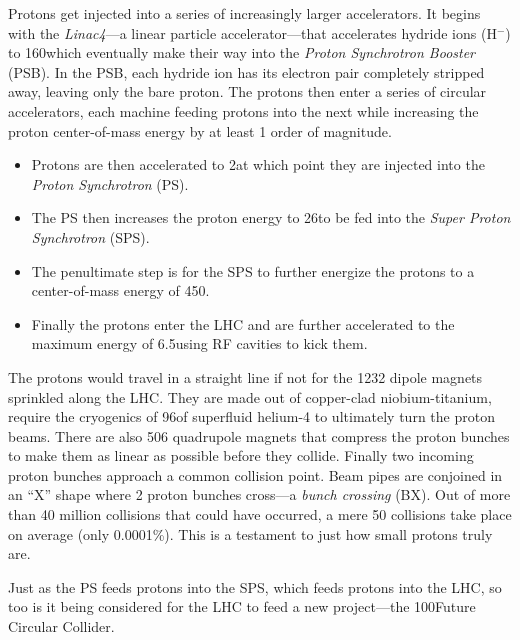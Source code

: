 Protons get injected into a series of increasingly larger accelerators.
It begins with the \emph{Linac4}---a linear particle accelerator---that accelerates hydride ions (H$^-$) to 160\MeV which eventually make their way into the \emph{Proton Synchrotron Booster} (PSB).
In the PSB, each hydride ion has its electron pair completely stripped away, leaving only the bare proton.
The protons then enter a series of circular accelerators, each machine feeding protons into the next while increasing the proton center-of-mass energy by at least 1 order of magnitude.
\begin{itemize}
    \item Protons are then accelerated to 2\GeV at which point they are injected into the \emph{Proton Synchrotron} (PS).
    \item The PS then increases the proton energy to 26\GeV to be fed into the \emph{Super Proton Synchrotron} (SPS).
    \item The penultimate step is for the SPS to further energize the protons to a center-of-mass energy of 450\GeV. %
    \item Finally the protons enter the LHC and are further accelerated to the maximum energy of 6.5\TeV using RF cavities to kick them.
\end{itemize}

The protons would travel in a straight line if not for the 1232 dipole magnets sprinkled along the LHC.
They are made out of copper-clad niobium-titanium, require the cryogenics of 96\tonne of superfluid helium-4 to ultimately turn the proton beams.
There are also 506 quadrupole magnets that compress the proton bunches to make them as linear as possible before they collide.
Finally two incoming proton bunches approach a common collision point.
Beam pipes are conjoined in an ``X'' shape
where 2 proton bunches cross---a \emph{bunch crossing} (BX).
Out of more than 40 million \pp collisions that could have occurred, a mere 50 collisions take place on average (\ie only 0.0001\%).
This is a testament to just how small protons truly are.

Just as the PS feeds protons into the SPS, which feeds protons into the LHC, so too is it being considered for the LHC to feed a new project---the 100\Km Future Circular Collider.

